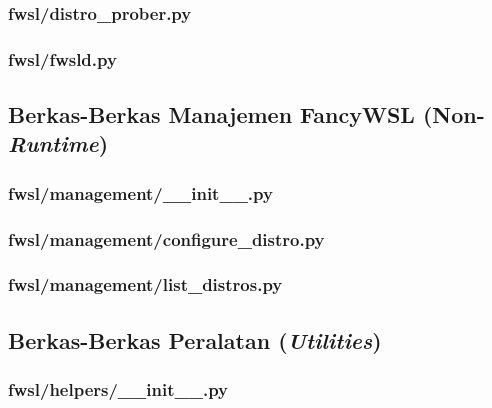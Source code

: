 \subsubsection{fwsl/distro\_prober.py}


\subsubsection{fwsl/fwsld.py}



\subsection{Berkas-Berkas Manajemen FancyWSL (Non-\textit{Runtime})}

\subsubsection{fwsl/management/\_\_init\_\_.py}


\subsubsection{fwsl/management/configure\_distro.py}


\subsubsection{fwsl/management/list\_distros.py}



\subsection{Berkas-Berkas Peralatan (\textit{Utilities})}

\subsubsection{fwsl/helpers/\_\_init\_\_.py}


